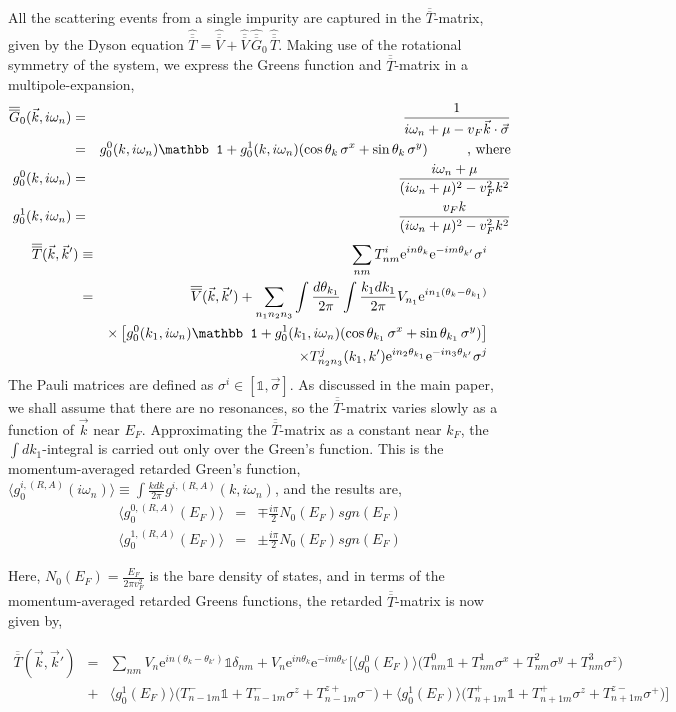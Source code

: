 \documentclass[letter,12pt,preprint,aps]{revtex4-1}
\newcommand{\ba}{\begin{eqnarray}}
\newcommand{\ea}{\end{eqnarray}}
\newcommand{\mI}{{\mathbb 1}}
\newcommand{\me}{\mathrm{e}}
\newcommand{\Vbar}{\overline{\overline{V}}}
\newcommand{\Gbar}{\overline{\overline{G}}}
\newcommand{\Tbar}{\overline{\overline{T}}}
\begin{document}
All the scattering events from a single impurity are captured in the $\Tbar$-matrix, given by the Dyson equation $\hat{\Tbar} = \hat{\Vbar} + \hat{\Vbar} \, \hat{\Gbar}_{0} \, \hat{\Tbar}$. Making use of the rotational symmetry of the system, we express the Greens function and $\Tbar$-matrix in a multipole-expansion,
%
\ba
\overline{\overline{G}}_0(\vec{k}, i \omega_n) & = & \frac{1}{i \omega_n + \mu - v_F \vec{k} \cdot \vec{\sigma}} \\
& = & g^0_0(k, i \omega_n) \mI + g^1_0(k, i \omega_n)(\cos \theta_k \, \sigma^x + \sin \theta_k \, \sigma^y) \hspace{1cm} \text{, where} \cr
g^{0}_{0}(k, i \omega_n) & = & \frac{i \omega_n + \mu}{(i \omega_n + \mu)^2 - v_F^2 k^2} \cr
g^{1}_{0}(k, i \omega_n) & = & \frac{v_F k}{(i \omega_n + \mu)^2 - v_F^2 k^2} \nonumber
\ea
%
\ba
\label{eqn: T matrix}
\Tbar(\vec{k}, \vec{k}') & \equiv & \sum_{nm} T^{i}_{nm} \me^{i n \theta_k} \me^{-i m \theta_{k'}} \sigma^i \cr 
 & = & \Vbar({\vec{k}, \vec{k}'})  + \sum_{n_1 n_2 n_3}  \int \frac{d \theta_{k_1}}{2 \pi} \int \frac{k_1 d k_1}{2 \pi} V_{n_1} \me^{i n_1 (\theta_{k} - \theta_{k_1})} \cr
 & & \times \left[ g^0_0(k_1, i \omega_n) \mI + g^1_0(k_1, i \omega_n)(\cos \theta_{k_1} \, \sigma^x + \sin \theta_{k_1} \, \sigma^y) \right] \cr
 & & \times T^{j}_{n_2 n_3}(k_1, k') \me^{i n_2 \theta_{k_1}} \me^{-i n_3 \theta_{k'}} \sigma^j
 \ea 
%
The Pauli matrices are defined as $\sigma^i \in [\mI, \vec{\sigma}]$. As discussed in the main paper, we shall assume that there are no resonances, so the $\Tbar$-matrix varies slowly as a function of $\vec{k}$ near $E_F$. Approximating the $\Tbar$-matrix as a constant near $k_F$, the $\int dk_1$-integral is carried out only over the Green's function. This is the momentum-averaged retarded Green's function, $\langle g^{i,(R, A)}_0(i \omega_n) \rangle \equiv \int \frac{k dk}{2 \pi} g^{i,(R, A)}(k, i \omega_n) $, and the results are,
%
\begin{subequations}
\ba
\label{eqn: momentum avg Greens func}
\langle g^{0,(R, A)}_0(E_F) \rangle & = &  \mp \frac{i \pi}{2} N_0(E_F) sgn(E_F)  \\
\langle g^{1,(R, A)}_0(E_F) \rangle & = & \pm \frac{i \pi}{2} N_0(E_F) sgn(E_F)   
\ea
\end{subequations}

Here, $N_0(E_F) = \tfrac{E_F}{2 \pi v_F^2}$ is the bare density of states, and in terms of the momentum-averaged retarded Greens functions, the retarded $\Tbar$-matrix is now given by,

\ba
\label{eqn: T matrix Dyson eqn}
\Tbar(\vec{k}, \vec{k}')  & = & \sum_{n m} V_n \me^{i n (\theta_{k} - \theta_{k'})} \mI \delta_{nm} + V_n \me^{i n \theta_k} \me^{- i m \theta_{k'}} \Big[ \langle g^0_0(E_F) \rangle \big( T^{0}_{n m} \mI + T^{1}_{n m} \sigma^x + T^{2}_{n m} \sigma^y + T^{3}_{n m} \sigma^z \big) \\
 & + & \langle g^1_0(E_F) \rangle \big( T^{-}_{n-1 m} \mI + T^{-}_{n-1 m} \sigma^z + T^{z+}_{n-1 m} \sigma^- \big) + \langle g^1_0(E_F) \rangle \big( T^{+}_{n+1 m} \mI + T^{+}_{n+1 m} \sigma^z + T^{z-}_{n+1 m} \sigma^+ \big) \Big] \nonumber
\ea
\end{document}

